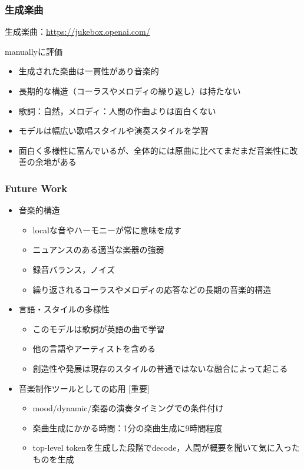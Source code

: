 \documentclass[dvipdfmx]{beamer}
\begin{document}
\begin{frame}
    \frametitle{生成楽曲}
    生成楽曲：\url{https://jukebox.openai.com/}
    \vspace{\baselineskip}

    manuallyに評価
    \begin{itemize}
        \item 生成された楽曲は一貫性があり音楽的
        \item 長期的な構造（コーラスやメロディの繰り返し）は持たない
        \item 歌詞：自然，メロディ：人間の作曲よりは面白くない
        \item モデルは幅広い歌唱スタイルや演奏スタイルを学習
        \item 面白く多様性に富んでいるが、全体的には原曲に比べてまだまだ音楽性に改善の余地がある
    \end{itemize}
\end{frame}


\begin{frame}
    \frametitle{Future Work}
    \begin{itemize}
        \item 音楽的構造
        \begin{itemize}
            \item localな音やハーモニーが常に意味を成す
            \item ニュアンスのある適当な楽器の強弱
            \item 録音バランス，ノイズ
            \item 繰り返されるコーラスやメロディの応答などの長期の音楽的構造
        \end{itemize}
        \vspace{0.5\baselineskip}
        \item 言語・スタイルの多様性
        \begin{itemize}
            \item このモデルは歌詞が英語の曲で学習
            \item 他の言語やアーティストを含める
            \item 創造性や発展は現存のスタイルの普通ではないな融合によって起こる
        \end{itemize}
        \vspace{0.5\baselineskip}
        \item 音楽制作ツールとしての応用 [重要]
        \begin{itemize}
            \item mood/dynamic/楽器の演奏タイミングでの条件付け
            \item 楽曲生成にかかる時間：1分の楽曲生成に9時間程度
            \item top-level tokenを生成した段階でdecode，人間が概要を聞いて気に入ったものを生成
        \end{itemize}
    \end{itemize}
\end{frame}
\end{document}
